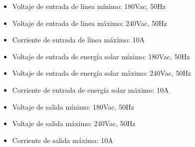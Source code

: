 \begin{itemize}
    \item Voltaje de entrada de línea mínimo: 180Vac, 50Hz
    \item Voltaje de entrada de línea máximo: 240Vac, 50Hz
    \item Corriente de entrada de línea máximo: 10A
    \item Voltaje de entrada de energía solar mínimo: 180Vac, 50Hz
    \item Voltaje de entrada de energía solar máximo: 240Vac, 50Hz
    \item Corriente de entrada de energía solar máximo: 10A
    \item Voltaje de salida mínimo: 180Vac, 50Hz\
    \item Voltaje de salida máximo: 240Vac, 50Hz
    \item Corriente de salida máxima: 10A
\end{itemize}